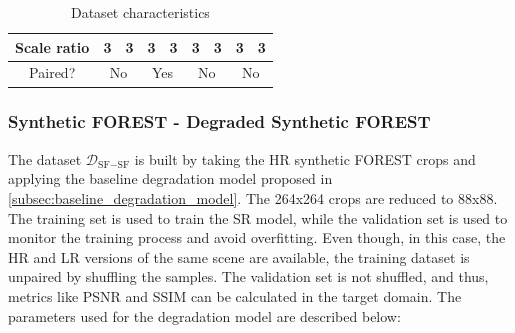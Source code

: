 \begin{table}[H]
{\begin{tabular}{|c|cccc|cccc|}
    Scale ratio & 3                                                            & \multicolumn{1}{c|}{3}                                                                     & 3                                                            & 3                                                                     & 3                                                            & \multicolumn{1}{c|}{3}                                                        & 3                                                            & 3                                                        \\ \hline
    Paired?     & \multicolumn{2}{c|}{No}                                                                                                                                   & \multicolumn{2}{c|}{Yes}                                                                                                             & \multicolumn{2}{c|}{No}                                                                                                                      & \multicolumn{2}{c|}{No}                                                                                                 \\ \hline
    \end{tabular}%
    }
    \caption{Dataset characteristics}
    \label{tab:dataset_characteristics}
    \end{table}


\subsubsection{Synthetic FOREST - Degraded Synthetic FOREST}
    The dataset $\mathcal{D}_{\text{SF}-\text{SF}}$ is built by taking the HR synthetic FOREST crops and applying the baseline degradation model proposed in \ref{subsec:baseline_degradation_model}. 
    The 264x264 crops are reduced to 88x88. The training set is used to train the SR model, while the validation set is used to monitor the training process and avoid overfitting. 
    Even though, in this case, the HR and LR versions of the same scene are available, the training dataset is unpaired by shuffling the samples.
    The validation set is not shuffled, and thus, metrics like PSNR and SSIM can be calculated in the target domain. The parameters used for the degradation model are described below:

